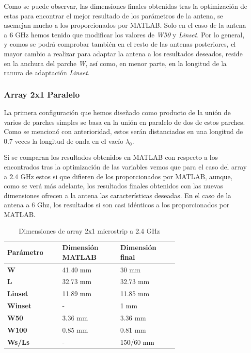 \par Como se puede observar, las dimensiones finales obtenidas tras la optimización de estas para encontrar el mejor resultado de los parámetros de la antena, se asemejan mucho a los proporcionados por MATLAB. Solo en el caso de la antena a 6 GHz hemos tenido que modificar los valores de \textit{W50} y \textit{Linset}. Por lo general, y comos se podrá comprobar también en el resto de las antenas posteriores, el mayor cambio a realizar para adaptar la antena a los resultados deseados, reside en la anchura del parche \textit{W}, así como, en menor parte, en la longitud de la ranura de adaptación \textit{Linset}.





\subsubsection{Array 2x1 Paralelo} 
\par La primera configuración que hemos diseñado como producto de la unión de varios de parches simples se basa en la unión en paralelo de dos de estos parches. Como se mencionó con anterioridad, estos serán distanciados en una longitud de 0.7 veces la longitud de onda en el vacío $\lambda_{0}$. 
\\
\par Si se comparan los resultados obtenidos en MATLAB con respecto a los encontrados tras la optimización de las variables vemos que para el caso del array a 2.4 GHz estos si que difieren de los proporcionados por MATLAB, aunque, como se verá más adelante, los resultados finales obtenidos con las nuevas dimensiones ofrecen a la antena las características deseadas. En el caso de la antena a 6 Ghz, los resultados si son casi idénticos a los proporcionados por MATLAB.

\begin{table}[H]
  
   \label{tab:array2x11}
   \small %
   \centering %
   \begin{tabular}{m{0.2\linewidth}m{0.25\linewidth}m{0.25\linewidth}} %
   \toprule[\heavyrulewidth]\toprule[\heavyrulewidth]
   \textbf{Parámetro} & \textbf{Dimensión MATLAB} & \textbf{Dimensión final} \\ 
   \midrule
   \textbf{W} & 41.40 mm & 30 mm \\
   \textbf{L} & 32.73 mm & 32.73 mm\\
   \textbf{Linset} & 11.89 mm & 11.85 mm\\
   \textbf{Winset} & - & 1 mm\\
   \textbf{W50} & 3.36 mm & 3.36 mm\\
   \textbf{W100} & 0.85 mm & 0.81 mm\\
   \textbf{Ws/Ls} & - & 150/60 mm\\
   \bottomrule[\heavyrulewidth] 
   \end{tabular}
   \caption{Dimensiones de array 2x1 microstrip a 2.4 GHz} 
\end{table}

